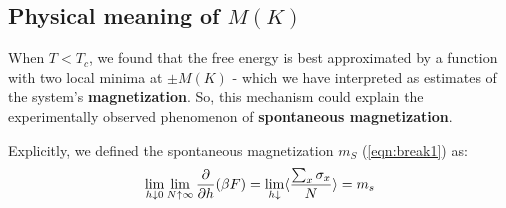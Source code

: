 \documentclass[../../main.tex]{subfiles}
\begin{document}
\subsection{Physical meaning of $M(K)$}
When $T < T_c$, we found that the free energy is best approximated by a function with two local minima at $\pm M(K)$ - which we have interpreted as estimates of the system's \textbf{magnetization}. So, this mechanism could explain the experimentally observed phenomenon of \textbf{spontaneous magnetization}.

\medskip

Explicitly, we defined the spontaneous magnetization $m_S$ (\ref{eqn:break1}) as:
\begin{align}\label{eqn:ms}
    \lim_{h \downarrow 0} \lim_{N \uparrow \infty} \pdv{h} (\beta F) = \lim_{h \downarrow } \langle \frac{\sum_x \sigma_x}{N}  \rangle = m_s
\end{align}

\end{document}
